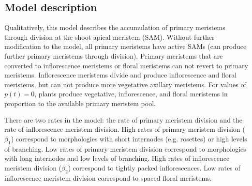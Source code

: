 \documentclass[12pt, oneside]{article}   	%
\begin{document}

\subsection{Model description}
Qualitatively, this model describes the accumulation of primary meristems through division at the shoot apical meristem (SAM). Without further modification to the model, all primary meristems have active SAMs (can produce further primary meristems through division). Primary meristems that are converted to inflorescence meristems or floral meristems can not revert to primary meristems. Inflorescence meristems divide and produce inflorescence and floral meristems, but can not produce more vegetative axillary meristems. For values of $p(t)=0$, plants produce vegetative, inflorescence, and floral meristems in proportion to the available primary meristem pool. 

There are two rates in the model: the rate of primary meristem division and the rate of inflorescence meristem division. High rates of primary meristem division ($\beta_1$) correspond to morphologies with short internodes (e.g. rosettes) or high levels of branching. Low rates of primary meristem division correspond to morphologies with long internodes and low levels of branching. High rates of inflorescence meristem division ($\beta_2$) correspond to tightly packed inflorescences. Low rates of inflorescence meristem division correspond to spaced floral meristems. 
\end{document}
